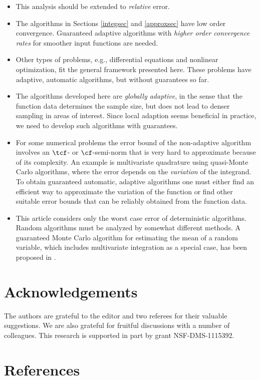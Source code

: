 \documentclass[]{elsarticle}
\theoremstyle{definition}
\theoremstyle{remark}
\begin{document}
\begin{itemize}

\item This analysis should be extended to \emph{relative} error.  

\item The algorithms in Sections \ref{integsec} and \ref{approxsec} have low order convergence.  Guaranteed adaptive algorithms with \emph{higher order convergence rates} for smoother input functions are needed.

\item Other types of problems, e.g., differential equations and nonlinear optimization, fit the general framework presented here.  These problems have adaptive, automatic algorithms, but without guarantees so far.

\item The algorithms developed here are \emph{globally adaptive}, in the sense that the function data determines the sample size, but does not lead to denser sampling in areas of interest.  Since local adaption seems beneficial in practice, we need to develop such algorithms with guarantees.

\item For some numerical problems the error bound of the non-adaptive algorithm involves an $\tcf$- or $\cf$-semi-norm that is very hard to approximate because of its complexity.  An example is multivariate quadrature using quasi-Monte Carlo algorithms, where the error depends on the \emph{variation} of the integrand.  To obtain guaranteed automatic, adaptive algorithms one must either find an efficient way to approximate the variation of the function or find other suitable error bounds that can be reliably obtained from the function data.  

\item This article considers only the worst case error of deterministic algorithms.  Random algorithms must be analyzed by somewhat different methods.  A guaranteed Monte Carlo algorithm for estimating the mean of a random variable, which includes multivariate integration as a special case, has been proposed in \cite{HicEtal14a}.

\end{itemize}

\section{Acknowledgements}  The authors are grateful to the editor and two referees for their valuable suggestions.  We are also grateful for fruitful discussions with a number of colleagues. This research is supported in part by grant NSF-DMS-1115392.

\section*{References}

%

\end{document}
